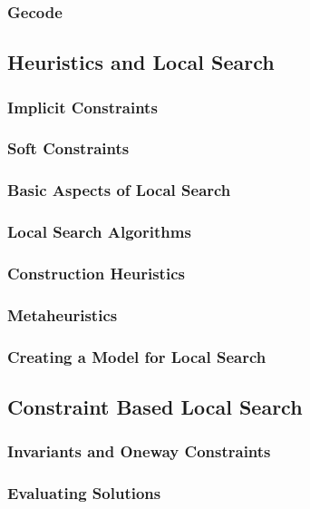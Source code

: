 \documentclass[a4paper,11pt]{article}
\begin{document}
    \subsubsection{Gecode}
    
  \subsection{Heuristics and Local Search}
  
        \subsubsection{Implicit Constraints}
    
        \subsubsection{Soft Constraints}
    
     \subsubsection{Basic Aspects of Local Search}
    
    \subsubsection{Local Search Algorithms}
     \label{sub_lsalg}
    \subsubsection{Construction Heuristics}
    
    \subsubsection{Metaheuristics}
    
    \subsubsection{Creating a Model for Local Search}
    
  \subsection{Constraint Based Local Search}
  
    \subsubsection{Invariants and Oneway Constraints}
    
    \subsubsection{Evaluating Solutions}
    
\end{document}
